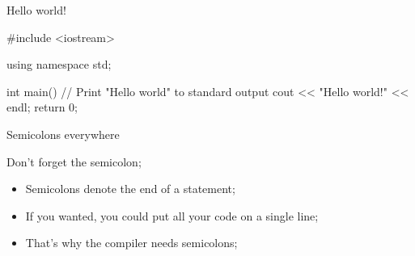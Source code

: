 \begin{frame}[fragile]{Hello world!}
    \begin{cpp}
        #include <iostream>

        using namespace std;

        int main()
        {
            // Print "Hello world" to standard output
            cout << "Hello world!" << endl;
            return 0;
        }
    \end{cpp}
\end{frame}

\begin{frame}{Semicolons everywhere}
    \begin{block}{Don't forget the semicolon\alert{;}}
        \begin{itemize}
            \item Semicolons denote the end of a statement\alert{;}
            \item If you wanted, you could put all your code on a single line\alert{;}
            \item That's why the compiler needs semicolons\alert{;}
        \end{itemize}
    \end{block}
\end{frame}



